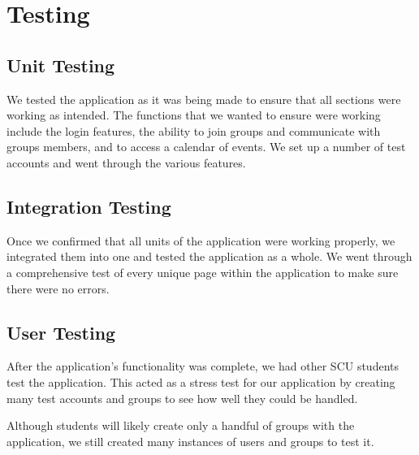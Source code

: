 \chapter{Testing}
\section{Unit Testing}
We tested the application as it was being made to ensure that all sections were working as intended. The functions that we wanted to ensure were working include the login features, the ability to join groups and communicate with groups members, and to access a calendar of events. We set up a number of test accounts and went through the various features.

\section{Integration Testing}
Once we confirmed that all units of the application were working properly, we integrated them into one and tested the application as a whole. We went through a comprehensive test of every unique page within the application to make sure there were no errors.

\section{User Testing}
After the application’s functionality was complete, we had other SCU students test the application. This acted as a stress test for our application by creating many test accounts and groups to see how well they could be handled.

Although students will likely create only a handful of groups with the application, we still created many instances of users and groups to test it.
